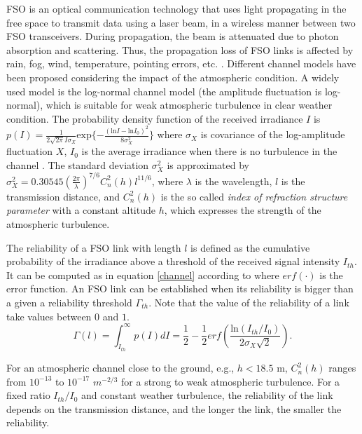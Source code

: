 \documentclass[onecolumn,11pt,draftclsnofoot]{IEEEtran}
\begin{document}
FSO is an optical communication technology that uses light propagating in the free space to transmit data using a laser beam, in a wireless manner between two FSO transceivers. During propagation, the beam is attenuated due to photon absorption and scattering. Thus, the propagation loss of FSO links is affected by rain, fog, wind, temperature, pointing errors, etc. \cite{Ghassemlooy2012}. Different channel models have been proposed considering the impact of the atmospheric condition. A widely used model is the log-normal channel model (the amplitude fluctuation is log-normal), which is suitable for weak atmospheric turbulence in clear weather condition. The probability density function of the received irradiance $I$ is $p(I) = \frac{1}{2 \sqrt{2\pi} I \sigma_X} \mbox{exp} \{-\frac{(\mbox{ln} {I} - \mbox{ln} {I_0})^2}{8\sigma^2_X}\}$ where $\sigma_X$ is covariance of the log-amplitude fluctuation $X$, $I_0$ is the average irradiance when there is no turbulence in the channel \cite{Zhu2002}. The standard deviation $\sigma^2_X$ is approximated by $\sigma^2_X = 0.30545 (\frac{2 \pi}{\lambda})^{7/6} C^2_n (h) l ^{11/6}$, where $\lambda$ is the wavelength, $l$ is the transmission distance, and $C^2_n (h)$ is the so called \emph{index of refraction structure parameter} with a constant altitude $h$, which expresses the strength of the atmospheric turbulence.

The reliability of a FSO link with length $l$ is defined as the cumulative probability of the irradiance above a threshold of the received signal intensity $I_{th}$. It can be computed as in equation \eqref{channel} according to \cite{Son2010} where $erf(\cdot)$ is the error function. An FSO link can be established when its reliability is bigger than a given a reliability threshold $\Gamma_{th}$. Note that the value of the reliability of a link take values between $0$ and $1$.
\begin{equation}\label{channel}
\Gamma(l) = \int_{I_{th}}^{\infty} p(I) dI  = \frac{1}{2} - \frac{1}{2} erf \left(\frac{\mbox{ln}(I_{th}/I_0)}{2 \sigma_X \sqrt{2}} \right).
\end{equation}

For an atmospheric channel close to the ground, e.g., $h < 18.5$ m,  $C^2_n (h)$ ranges from $10^{-13}$ to $10^{-17}$ $m^{-2/3}$ for a strong to weak atmospheric turbulence. For a fixed ratio $I_{th}/I_0$ and constant weather turbulence, the reliability of the link depends on the transmission distance, and the longer the link, the smaller the reliability.
\end{document}

